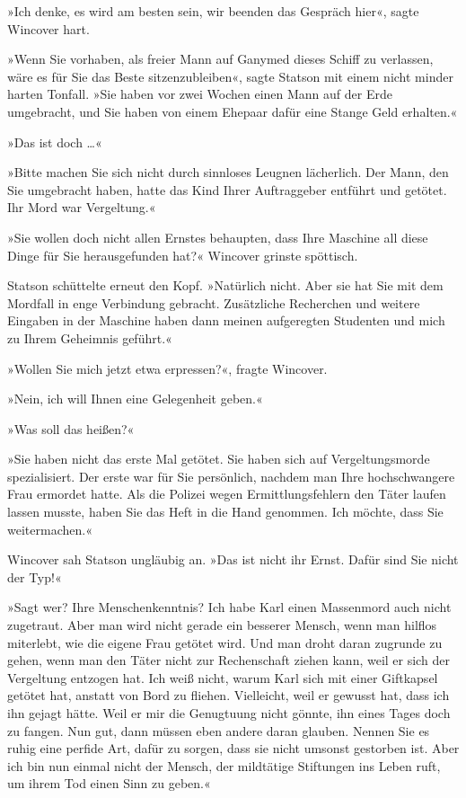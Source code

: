 »Ich denke, es wird am besten sein, wir beenden das Gespräch hier«,
sagte Wincover hart.

»Wenn Sie vorhaben, als freier Mann auf Ganymed dieses Schiff zu
verlassen, wäre es für Sie das Beste sitzenzubleiben«, sagte
Statson mit einem nicht minder harten Tonfall. »Sie haben vor zwei
Wochen einen Mann auf der Erde umgebracht, und Sie haben von einem
Ehepaar dafür eine Stange Geld erhalten.«

»Das ist doch \ldots{}«

»Bitte machen Sie sich nicht durch sinnloses Leugnen lächerlich.
Der Mann, den Sie umgebracht haben, hatte das Kind Ihrer
Auftraggeber entführt und getötet. Ihr Mord war Vergeltung.«

»Sie wollen doch nicht allen Ernstes behaupten, dass Ihre Maschine
all diese Dinge für Sie herausgefunden hat?« Wincover grinste
spöttisch.

Statson schüttelte erneut den Kopf. »Natürlich nicht. Aber sie hat
Sie mit dem Mordfall in enge Verbindung gebracht. Zusätzliche
Recherchen und weitere Eingaben in der Maschine haben dann meinen
aufgeregten Studenten und mich zu Ihrem Geheimnis geführt.«

»Wollen Sie mich jetzt etwa erpressen?«, fragte Wincover.

»Nein, ich will Ihnen eine Gelegenheit geben.«

»Was soll das heißen?«

»Sie haben nicht das erste Mal getötet. Sie haben sich auf
Vergeltungsmorde spezialisiert. Der erste war für Sie persönlich,
nachdem man Ihre hochschwangere Frau ermordet hatte. Als die
Polizei wegen Ermittlungsfehlern den Täter laufen lassen musste,
haben Sie das Heft in die Hand genommen. Ich möchte, dass Sie
weitermachen.«

Wincover sah Statson ungläubig an. »Das ist nicht ihr Ernst. Dafür
sind Sie nicht der Typ!«

»Sagt wer? Ihre Menschenkenntnis? Ich habe Karl einen Massenmord
auch nicht zugetraut. Aber man wird nicht gerade ein besserer
Mensch, wenn man hilflos miterlebt, wie die eigene Frau getötet
wird. Und man droht daran zugrunde zu gehen, wenn man den Täter
nicht zur Rechenschaft ziehen kann, weil er sich der Vergeltung
entzogen hat. Ich weiß nicht, warum Karl sich mit einer Giftkapsel
getötet hat, anstatt von Bord zu fliehen. Vielleicht, weil er
gewusst hat, dass ich ihn gejagt hätte. Weil er mir die Genugtuung
nicht gönnte, ihn eines Tages doch zu fangen. Nun gut, dann müssen
eben andere daran glauben. Nennen Sie es ruhig eine perfide Art,
dafür zu sorgen, dass sie nicht umsonst gestorben ist. Aber ich bin
nun einmal nicht der Mensch, der mildtätige Stiftungen ins Leben
ruft, um ihrem Tod einen Sinn zu geben.«


